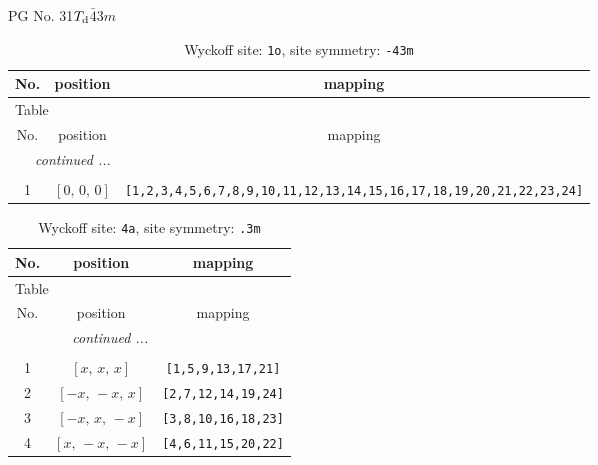 \documentclass[fleqn,8pt]{jsarticle}
\begin{document}
\setcounter{MaxMatrixCols}{32}

\renewcommand{\tablename}{Table~}
\renewcommand{\figurename}{Figure~}
\begin{center}
\LARGE
PG No. 31\quad$T_{\rm d}$\quad$\bar{4}3m$\quad[ cubic ]
\end{center}
\renewcommand{\arraystretch}{1.2}
\begin{longtable}{ccc}
\caption{Wyckoff site: {\tt 1o}, site symmetry: {\tt -43m}}
 \\
 \hline \hline
No. & position & mapping \\ \hline \endfirsthead

\multicolumn{2}{l}{\tablename\ \thetable{}} \\
 \hline \hline
No. & position & mapping \\ \hline \endhead

 \hline \hline
\multicolumn{2}{r}{\footnotesize\it continued ...} \\ \endfoot

 \hline \hline
\multicolumn{2}{r}{} \\ \endlastfoot

1 & $\left[ 0,\, 0,\, 0 \right]$ & {\tt [1,2,3,4,5,6,7,8,9,10,11,12,13,14,15,16,17,18,19,20,21,22,23,24]} \\
\end{longtable}
\renewcommand{\arraystretch}{1.2}
\begin{longtable}{ccc}
\caption{Wyckoff site: {\tt 4a}, site symmetry: {\tt .3m}}
 \\
 \hline \hline
No. & position & mapping \\ \hline \endfirsthead

\multicolumn{2}{l}{\tablename\ \thetable{}} \\
 \hline \hline
No. & position & mapping \\ \hline \endhead

 \hline \hline
\multicolumn{2}{r}{\footnotesize\it continued ...} \\ \endfoot

 \hline \hline
\multicolumn{2}{r}{} \\ \endlastfoot

1 & $\left[ x,\, x,\, x \right]$ & {\tt [1,5,9,13,17,21]} \\ \hline
2 & $\left[ - x,\, - x,\, x \right]$ & {\tt [2,7,12,14,19,24]} \\ \hline
3 & $\left[ - x,\, x,\, - x \right]$ & {\tt [3,8,10,16,18,23]} \\ \hline
4 & $\left[ x,\, - x,\, - x \right]$ & {\tt [4,6,11,15,20,22]} \\
\end{longtable}
\end{document}
